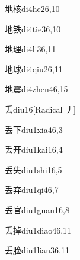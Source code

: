 \begin{verbete}{地核}{di4he2}{6,10}
\end{verbete}

\begin{verbete}{地铁}{di4tie3}{6,10}
\end{verbete}

\begin{verbete}{地理}{di4li3}{6,11}
\end{verbete}

\begin{verbete}{地球}{di4qiu2}{6,11}
\end{verbete}

\begin{verbete}{地震}{di4zhen4}{6,15}
\end{verbete}

\begin{verbete}{丢}{diu1}{6}[Radical 丿]
\end{verbete}

\begin{verbete}{丢下}{diu1xia4}{6,3}
\end{verbete}

\begin{verbete}{丢开}{diu1kai1}{6,4}
\end{verbete}

\begin{verbete}{丢失}{diu1shi1}{6,5}
\end{verbete}

\begin{verbete}{丢弃}{diu1qi4}{6,7}
\end{verbete}

\begin{verbete}{丢官}{diu1guan1}{6,8}
\end{verbete}

\begin{verbete}{丢掉}{diu1diao4}{6,11}
\end{verbete}

\begin{verbete}{丢脸}{diu1lian3}{6,11}
\end{verbete}

